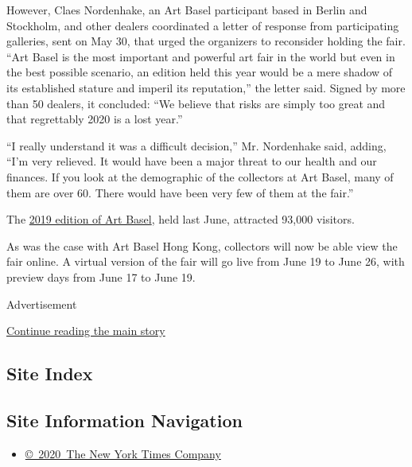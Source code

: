 However, Claes Nordenhake, an Art Basel participant based in Berlin and
Stockholm, and other dealers coordinated a letter of response from
participating galleries, sent on May 30, that urged the organizers to
reconsider holding the fair. ``Art Basel is the most important and
powerful art fair in the world but even in the best possible scenario,
an edition held this year would be a mere shadow of its established
stature and imperil its reputation,'' the letter said. Signed by more
than 50 dealers, it concluded: ``We believe that risks are simply too
great and that regrettably 2020 is a lost year.''

``I really understand it was a difficult decision,'' Mr. Nordenhake
said, adding, ``I'm very relieved. It would have been a major threat to
our health and our finances. If you look at the demographic of the
collectors at Art Basel, many of them are over 60. There would have been
very few of them at the fair.''

The
\href{https://www.nytimes3xbfgragh.onion/2019/06/13/arts/art-basel-collectors.html}{2019
edition of Art Basel}, held last June, attracted 93,000 visitors.

As was the case with Art Basel Hong Kong, collectors will now be able
view the fair online. A virtual version of the fair will go live from
June 19 to June 26, with preview days from June 17 to June 19.

Advertisement

\protect\hyperlink{after-bottom}{Continue reading the main story}

\hypertarget{site-index}{%
\subsection{Site Index}\label{site-index}}

\hypertarget{site-information-navigation}{%
\subsection{Site Information
Navigation}\label{site-information-navigation}}

\begin{itemize}
\tightlist
\item
  \href{https://help.nytimes3xbfgragh.onion/hc/en-us/articles/115014792127-Copyright-notice}{©~2020~The
  New York Times Company}
\end{itemize}

